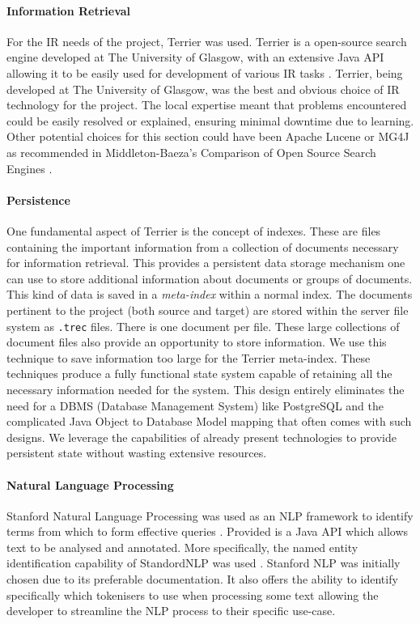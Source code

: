 \documentclass{l4proj}
\newcommand{\code}[1]{\texttt{#1}}
\begin{document}
\paragraph{Information Retrieval}
For the IR needs of the project, Terrier was used. Terrier is a open-source search engine developed at The University of Glasgow, with an extensive Java API allowing it to be easily used for development of various IR tasks \cite{terrier} \cite{macdonald2012puppy}.
Terrier, being developed at The University of Glasgow, was the best and obvious choice of IR technology for the project. The local expertise meant that problems encountered could be easily resolved or explained, ensuring minimal downtime due to learning.
Other potential choices for this section could have been Apache Lucene or MG4J as recommended in Middleton-Baeza's Comparison of Open Source Search Engines \cite{middleton2007comparison}.

\paragraph{Persistence}
One fundamental aspect of Terrier is the concept of indexes. These are files containing the important information from a collection of documents necessary for information retrieval. This provides a persistent data storage mechanism one can use to store additional information about documents or groups of documents. This kind of data is saved in a \textit{meta-index} within a normal index.
The documents pertinent to the project (both source and target) are stored within the server file system as \code{.trec} files. There is one document per file.
These large collections of document files also provide an opportunity to store information. We use this technique to save information too large for the Terrier meta-index.
These techniques produce a fully functional state system capable of retaining all the necessary information needed for the system.
This design entirely eliminates the need for a DBMS (Database Management System) like PostgreSQL and the complicated Java Object to Database Model mapping that often comes with such designs.
We leverage the capabilities of already present technologies to provide persistent state without wasting extensive resources.

\paragraph{Natural Language Processing}
Stanford Natural Language Processing was used as an NLP framework to identify terms from which to form effective queries \cite{manning-EtAl:2014:P14-5}. Provided is a Java API which allows text to be analysed and annotated. More specifically, the named entity identification capability of StandordNLP was used \cite{finkel2005incorporating}.
Stanford NLP was initially chosen due to its preferable documentation. It also offers the ability to identify specifically which tokenisers to use when processing some text allowing the developer to streamline the NLP process to their specific use-case.
\end{document}
